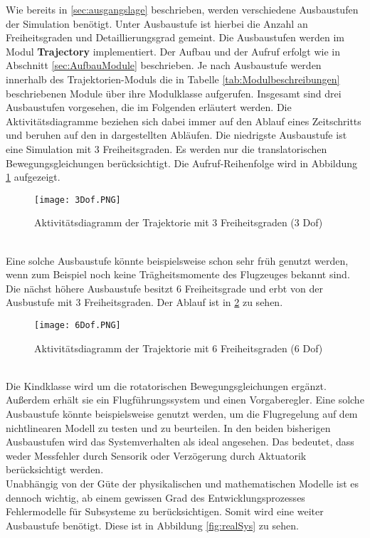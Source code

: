 Wie bereits in \ref{sec:ausgangslage} beschrieben, werden verschiedene Ausbaustufen der Simulation benötigt. Unter Ausbaustufe ist hierbei die Anzahl an Freiheitsgraden und Detaillierungsgrad gemeint. Die Ausbaustufen werden im Modul \textbf{Trajectory} implementiert. Der Aufbau und der Aufruf erfolgt wie in Abschnitt \ref{sec:AufbauModule} beschrieben. Je nach Ausbaustufe werden innerhalb des Trajektorien-Moduls die in Tabelle \ref{tab:Modulbeschreibungen}  beschriebenen Module über ihre Modulklasse aufgerufen.\newpage
Insgesamt sind drei Ausbaustufen vorgesehen, die im Folgenden erläutert werden. Die Aktivitätsdiagramme beziehen sich dabei immer auf den Ablauf eines Zeitschritts und beruhen auf den in \cite{Zipfel.2007} dargestellten Abläufen.
Die niedrigste Ausbaustufe ist eine Simulation mit 3 Freiheitsgraden. Es werden nur die translatorischen Bewegungsgleichungen berücksichtigt. Die Aufruf-Reihenfolge wird in Abbildung \ref{fig:3_Dof} aufgezeigt.
\begin{figure}[h]
	\centering\texttt{[image: 3Dof.PNG]}
	\caption{Aktivitätsdiagramm der Trajektorie mit 3 Freiheitsgraden (3 Dof)}
	\label{fig:3_Dof}
\end{figure}\\
Eine solche Ausbaustufe könnte beispielsweise schon sehr früh genutzt werden, wenn zum Beispiel noch keine Trägheitsmomente des Flugzeuges bekannt sind. \\
Die nächst höhere Ausbaustufe besitzt 6 Freiheitsgrade und erbt von der Ausbustufe mit 3 Freiheitsgraden. Der Ablauf ist in \ref{fig:6Dof} zu sehen. 
\begin{figure}[h]
	\texttt{[image: 6Dof.PNG]}
	\caption{Aktivitätsdiagramm der Trajektorie mit 6 Freiheitsgraden (6 Dof)}
	\label{fig:6Dof}
\end{figure}\\
Die Kindklasse wird um die rotatorischen Bewegungsgleichungen ergänzt. Außerdem erhält sie ein Flugführungssystem und einen Vorgaberegler. Eine solche Ausbaustufe könnte beispielsweise genutzt werden, um die Flugregelung auf dem nichtlinearen Modell zu testen und zu beurteilen.  In den beiden bisherigen Ausbaustufen wird das Systemverhalten als ideal angesehen. Das bedeutet, dass weder Messfehler durch Sensorik oder Verzögerung durch Aktuatorik berücksichtigt werden. \\
Unabhängig von der Güte der physikalischen und mathematischen Modelle ist es dennoch wichtig, ab einem gewissen Grad des Entwicklungsprozesses Fehlermodelle für Subsysteme zu berücksichtigen. Somit wird eine weiter Ausbaustufe benötigt. Diese ist in Abbildung \ref{fig:realSys} zu sehen.
